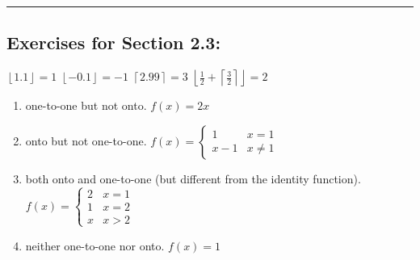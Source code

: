 \documentclass[12pt]{article}  %
\providecommand{\ceil}[1]{$\left \lceil #1 \right \rceil$}
\providecommand{\floor}[1]{$\left \lfloor #1 \right \rfloor$}
\begin{document}
\rule{6in}{.1pt}       %



\subsection*{Exercises for Section 2.3:}     

\newline
\floor{1.1}$=1$\newline
\floor{-0.1}$=-1$\newline
\ceil{2.99}$=3$\newline
$\left\lfloor\frac{1}{2}+\left\lceil\frac{3}{2}\right\rceil\right\rfloor=2$

\newline
{}
\begin{enumerate}
    \item one-to-one but not onto.\newline
        $f(x)=2x$
    \item onto but not one-to-one.\newline
        $\displaystyle f(x)=\begin{cases}
        1 & x=1\\
        x-1 & x\neq1
        \end{cases}
        $
    \item both onto and one-to-one (but different from the identity function).\newline
        $\displaystyle f(x)=\begin{cases}
        2 & x=1\\
        1 & x=2\\
        x & x>2
        \end{cases}
        $
    \item neither one-to-one nor onto.\newline
        $f(x)=1$
\end{enumerate}
\end{document}
